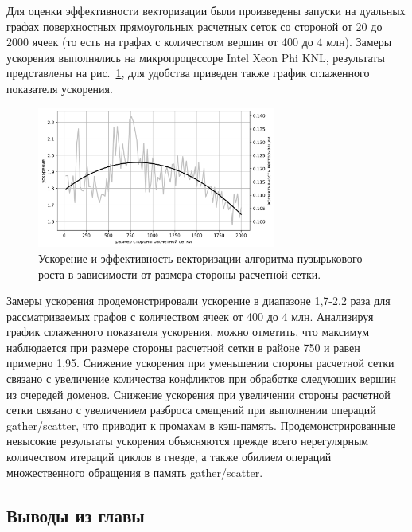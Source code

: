 Для оценки эффективности векторизации были произведены запуски на дуальных графах поверхностных прямоугольных расчетных сеток со стороной от 20 до 2000 ячеек (то есть на графах с количеством вершин от 400 до 4 млн).
Замеры ускорения выполнялись на микропроцессоре Intel Xeon Phi KNL\label{abbr:knl-12}, результаты представлены на рис.~\ref{fig:text_4_vec_integer_sp}, для удобства приведен также график сглаженного показателя ускорения.

\begin{figure}[ht]
\centering
\includegraphics[width=0.7\textwidth]{fig/vec_genetic_chart_speedup_rus.png}
\singlespacing
{}\caption{Ускорение и эффективность векторизации алгоритма пузырькового роста в зависимости от размера стороны расчетной сетки.}
\label{fig:text_4_vec_integer_sp}
\end{figure}

Замеры ускорения продемонстрировали ускорение в диапазоне 1,7-2,2 раза для рассматриваемых графов с количеством ячеек от 400 до 4 млн.
Анализируя график сглаженного показателя ускорения, можно отметить, что максимум наблюдается при размере стороны расчетной сетки в районе 750 и равен примерно 1,95.
Снижение ускорения при уменьшении стороны расчетной сетки связано с увеличение количества конфликтов при обработке следующих вершин из очередей доменов.
Снижение ускорения при увеличении стороны расчетной сетки связано с увеличением разброса смещений при выполнении операций gather/scatter, что приводит к промахам в кэш-память.
Продемонстрированные невысокие результаты ускорения объясняются прежде всего нерегулярным количеством итераций циклов в гнезде, а также обилием операций множественного обращения в память gather/scatter.


\subsection{Выводы из главы}

